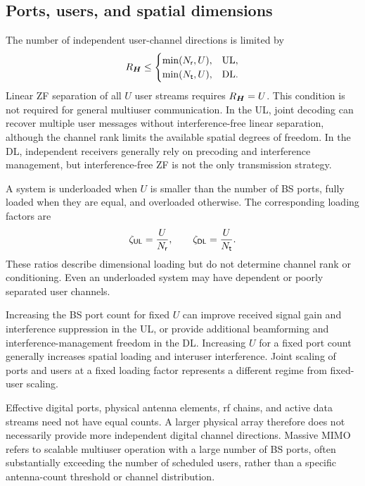 \subsection{Ports, users, and spatial dimensions}
The number of independent user-channel directions is limited by
\begin{equation*}
	R_{\bm{H}}\leq
	\begin{cases}
		\min(N_{\mathsf{r}},U), & \text{UL},\\
		\min(N_{\mathsf{t}},U), & \text{DL}.
	\end{cases}
\end{equation*}
Linear ZF separation of all $U$ user streams requires $R_{\bm{H}}=U$. This condition is not required for general multiuser communication. In the UL, joint decoding can recover multiple user messages without interference-free linear separation, although the channel rank limits the available spatial degrees of freedom. In the DL, independent receivers generally rely on precoding and interference management, but interference-free ZF is not the only transmission strategy.

A system is underloaded when $U$ is smaller than the number of BS ports, fully loaded when they are equal, and overloaded otherwise. The corresponding loading factors are
\begin{equation*}
	\zeta_{\mathsf{UL}}=\frac{U}{N_{\mathsf{r}}},
	\qquad
	\zeta_{\mathsf{DL}}=\frac{U}{N_{\mathsf{t}}}.
\end{equation*}
These ratios describe dimensional loading but do not determine channel rank or conditioning. Even an underloaded system may have dependent or poorly separated user channels.

Increasing the BS port count for fixed $U$ can improve received signal gain and interference suppression in the UL, or provide additional beamforming and interference-management freedom in the DL. Increasing $U$ for a fixed port count generally increases spatial loading and interuser interference. Joint scaling of ports and users at a fixed loading factor represents a different regime from fixed-user scaling.

Effective digital ports, physical antenna elements, \ac{rf} chains, and active data streams need not have equal counts. A larger physical array therefore does not necessarily provide more independent digital channel directions. Massive MIMO refers to scalable multiuser operation with a large number of BS ports, often substantially exceeding the number of scheduled users, rather than a specific antenna-count threshold or channel distribution. 

